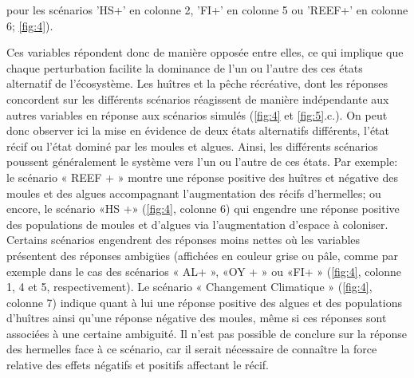 \documentclass[12pt]{report}
\begin{document}
pour les scénarios 'HS+' en colonne 2, 'FI+' en colonne 5 ou 'REEF+' en colonne 6; \autoref{fig:4}). 

Ces variables répondent donc de manière opposée entre elles, ce qui implique que chaque perturbation facilite la dominance de l'un ou l'autre des ces états alternatif de l'écosystème. Les huîtres et la pêche récréative, dont les réponses concordent sur les différents scénarios réagissent de manière indépendante aux autres variables en réponse aux scénarios simulés (\autoref{fig:4} et \autoref{fig:5}.c.).
\newline \newline
On peut donc observer ici la mise en évidence de deux états alternatifs différents, l'état récif ou l'état dominé par les moules et algues. Ainsi, les différents scénarios poussent généralement le système vers l'un ou l'autre de ces états. Par exemple: le scénario « REEF + » montre une réponse positive des huîtres et négative des moules et des algues accompagnant l’augmentation des récifs d’hermelles; ou encore, le scénario «HS +» (\autoref{fig:4}, colonne 6) qui engendre une réponse positive des populations de moules et d’algues via l'augmentation d'espace à coloniser.  Certains scénarios engendrent des réponses moins nettes où les variables présentent des réponses ambigües (affichées en couleur grise ou pâle, comme par exemple dans le cas des scénarios « AL+ », «OY + » ou «FI+ » (\autoref{fig:4}, colonne 1, 4 et 5, respectivement). Le scénario « Changement Climatique » (\autoref{fig:4}, colonne 7) indique quant à lui une réponse positive des algues et des populations d’huîtres ainsi qu’une réponse négative des moules, même si ces réponses sont associées à une certaine ambiguité. Il n’est pas possible de conclure sur la réponse des hermelles face à ce scénario, car il serait nécessaire de connaître la force relative des effets négatifs et positifs affectant le récif. 
\newline 
\end{document}
